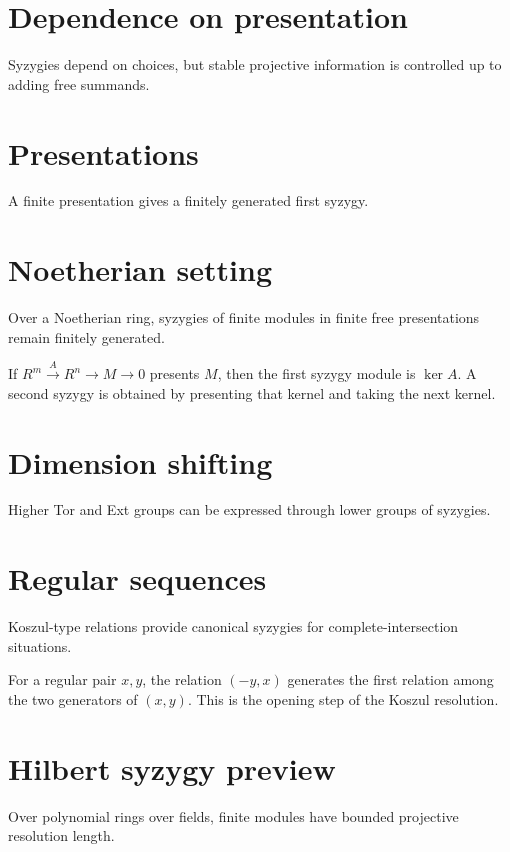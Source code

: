 \section{Dependence on presentation}
Syzygies depend on choices, but stable projective information is controlled up to adding free summands.

\section{Presentations}
A finite presentation gives a finitely generated first syzygy.

\section{Noetherian setting}
Over a Noetherian ring, syzygies of finite modules in finite free presentations remain finitely generated.

\begin{example}\label{ex:v24-expand-02}
If $R^m\xrightarrow{A}R^n\to M\to0$ presents $M$, then the first syzygy module is $\ker A$. A second syzygy is obtained by presenting that kernel and taking the next kernel.
\end{example}
\section{Dimension shifting}
Higher Tor and Ext groups can be expressed through lower groups of syzygies.

\section{Regular sequences}
Koszul-type relations provide canonical syzygies for complete-intersection situations.

\begin{example}\label{ex:v24-expand-03}
For a regular pair $x,y$, the relation $(-y,x)$ generates the first relation among the two generators of $(x,y)$. This is the opening step of the Koszul resolution.
\end{example}
\section{Hilbert syzygy preview}
Over polynomial rings over fields, finite modules have bounded projective resolution length.


